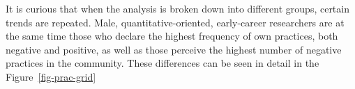 \documentclass[
  letterpaper,
  DIV=11,
  numbers=noendperiod]{scrartcl}
\begin{document}
It is curious that when the analysis is broken down into different
groups, certain trends are repeated. Male, quantitative-oriented,
early-career researchers are at the same time those who declare the
highest frequency of own practices, both negative and positive, as well
as those perceive the highest number of negative practices in the
community. These differences can be seen in detail in the
Figure~\ref{fig-prac-grid}

\begin{figure}

\begin{minipage}[t]{\linewidth}

{\centering 


}

\end{minipage}%
\newline
\begin{minipage}[t]{\linewidth}

{\centering 

}
\end{minipage}
\end{figure}
\end{document}
